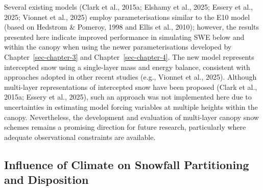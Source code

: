 \documentclass[
  letterpaper,
]{tex/uofsthesis-cs}
\begin{document}
Several existing models (Clark et al., 2015a; Elshamy et al., 2025;
Essery et al., 2025; Vionnet et al., 2025) employ parameterisations
similar to the E10 model (based on Hedstrom \& Pomeroy, 1998 and Ellis
et al., 2010); however, the results presented here indicate improved
performance in simulating SWE below and within the canopy when using the
newer parameterisations developed by Chapter~\ref{sec-chapter-3} and
Chapter~\ref{sec-chapter-4}. The new model represents intercepted snow
using a single-layer mass and energy balance, consistent with approaches
adopted in other recent studies (e.g., Vionnet et al., 2025). Although
multi-layer representations of intercepted snow have been proposed
(Clark et al., 2015a; Essery et al., 2025), such an approach was not
implemented here due to uncertainties in estimating model forcing
variables at multiple heights within the canopy. Nevertheless, the
development and evaluation of multi-layer canopy snow schemes remains a
promising direction for future research, particularly where adequate
observational constraints are available.

\subsection{Influence of Climate on Snowfall Partitioning and
Disposition}\label{influence-of-climate-on-snowfall-partitioning-and-disposition}
\end{document}
